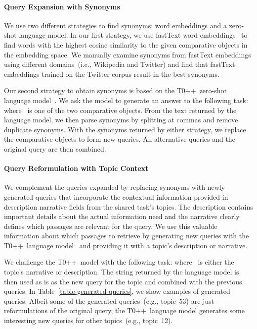 \paragraph{Query Expansion with Synonyms}

We use two different strategies to find synonyms: \Ni word embeddings and \Nii a zero-shot language model.
In our first strategy, we use fastText word embeddings~\cite{BojanowskiGJM2017} to find words with the highest cosine similarity to the given comparative objects in the embedding space.
We manually examine synonyms from fastText embeddings using different domains~(i.e., Wikipedia and Twitter) and find that fastText embeddings trained on the Twitter corpus result in the best synonyms.

Our second strategy to obtain synonyms is based on the T0++~zero-shot language model~\cite{SanhWRBSACSLRDBXTSSKCNDCJWMSYPBWNRSSFFTBGBWR2021}.
We ask the model to generate an answer to the following task:  where ~is one of the two comparative objects.
From the text returned by the language model, we then parse synonyms by splitting at commas and remove duplicate synonyms.
With the synonyms returned by either strategy, we replace the comparative objects to form new queries. All alternative queries and the original query are then combined.

\paragraph{Query Reformulation with Topic Context}


We complement the queries expanded by replacing synonyms with newly generated queries that incorporate the contextual information provided in description narrative fields from the shared task's topics.
The description contains important details about the actual information need and the narrative clearly defines which passages are relevant for the query.
We use this valuable information about which passages to retrieve by generating new queries with the T0++~language model~\cite{SanhWRBSACSLRDBXTSSKCNDCJWMSYPBWNRSSFFTBGBWR2021} and providing it with a topic's description or narrative.

We challenge the T0++~model with the following task:  where ~is either the topic's narrative or description.
The string returned by the language model is then used as is as the new query for the topic and combined with the previous queries.
In Table~\ref{table-generated-queries}, we show examples of generated queries.
Albeit some of the generated queries~(e.g., topic~53) are just reformulations of the original query, the T0++~language model generates some interesting new queries for other topics~(e.g., topic~12).

